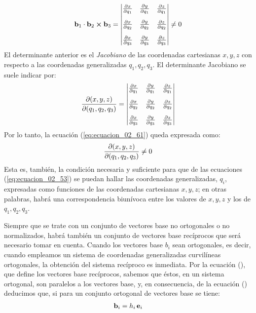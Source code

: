 \documentclass[12pt]{article}
\begin{document}
\bgroup
\everymath{\displaystyle}
\begin{align}
    \vb{b}_{1} \cdot \vb{b}_{2} \cp \vb{b}_{3} = \mdet{
        \pdv{x}{q_{1}} & \pdv{y}{q_{1}} & \pdv{z}{q_{1}} \\[1em]
        \pdv{x}{q_{2}} & \pdv{y}{q_{2}} & \pdv{z}{q_{2}} \\[1em]
        \pdv{x}{q_{3}} & \pdv{y}{q_{3}} & \pdv{z}{q_{3}}
    } \neq 0
    \label{eq:ecuacion_02_61}
\end{align}
\egroup
El determinante anterior es el \emph{Jacobiano} de las coordenadas cartesianas $x, y, z$ con respecto a las coordenadas generalizadas $q_{1}, q_{2}, q_{3}$. El determinante Jacobiano se suele indicar por:
\bgroup
\everymath{\displaystyle}
\begin{align}
    \pdv{(x, y, z)}{(q_{1}, q_{2}, q_{3})} = \mdet{
        \pdv{x}{q_{1}} & \pdv{y}{q_{1}} & \pdv{z}{q_{1}} \\[1em]
        \pdv{x}{q_{2}} & \pdv{y}{q_{2}} & \pdv{z}{q_{2}} \\[1em]
        \pdv{x}{q_{3}} & \pdv{y}{q_{3}} & \pdv{z}{q_{3}}
    }
    \label{eq:ecuacion_02_62}
\end{align}
\egroup
Por lo tanto, la ecuación (\ref{eq:ecuacion_02_61}) queda expresada como:
\begin{align*}
    \pdv{(x, y, z)}{(q_{1}, q_{2}, q_{3})} \neq 0
\end{align*}
Esta es, también, la condición necesaria y suficiente para que de las ecuaciones (\ref{eq:ecuacion_02_53}) se puedan hallar las coordenadas generalizadas, $q_{i}$, expresadas como funciones de las coordenadas cartesianas $x, y, z$; en otras palabras, habrá una correspondencia biunívoca entre los valores de $x, y, z$ y los de $q_{1}, q_{2}, q_{3}$.
\par
Siempre que se trate con un conjunto de vectores base no ortogonales o no normalizados, habrá también un conjunto de vectores base recíprocos que será necesario tomar en cuenta. Cuando los vectores base $b_{i}$ sean ortogonales, es decir, cuando empleamos un sistema de coordenadas generalizadas curvilíneas ortogonales, la obtención del sistema recíproco es inmediata. Por la ecuación (), que define 
los vectores base recíprocos, sabemos que éstos, en un sistema ortogonal, son paralelos a los vectores base, y, en consecuencia, de la ecuación () deducimos que, si para un conjunto ortogonal de vectores base se tiene:
\begin{align}
    \vb{b}_{i} = h_{i} \, \vb{e}_{i}
    \label{eq:ecuacion_02_63} 
\end{align}
\end{document}
